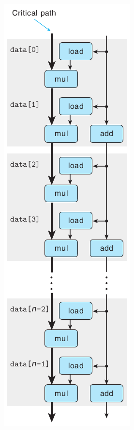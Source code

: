 \begin{figure}[!ht]
\begin{minipage}{0.33\textwidth}
        \includegraphics[width=\textwidth]{img/5-7}
    \end{minipage}
\end{figure}

